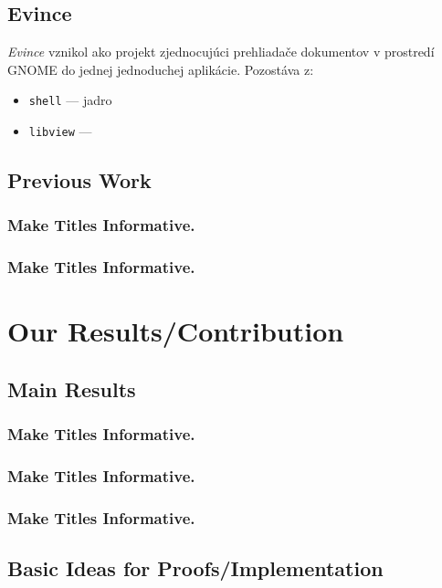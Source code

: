 \documentclass{beamer}
\begin{document}
\subsection{Evince}
\begin{frame}
\emph{Evince} vznikol ako projekt zjednocujúci prehliadače dokumentov v prostredí GNOME do jednej jednoduchej aplikácie. Pozostáva z:
    \begin{itemize}
     \item \texttt{shell} --- jadro
     \item \texttt{libview} --- 
    \end{itemize}
\end{frame}

\subsection{Previous Work}

\begin{frame}
  \frametitle{Make Titles Informative.}
\end{frame}

\begin{frame}
  \frametitle{Make Titles Informative.}
\end{frame}


 
\section{Our Results/Contribution}

\subsection{Main Results}

\begin{frame}
  \frametitle{Make Titles Informative.}
\end{frame}

\begin{frame}
  \frametitle{Make Titles Informative.}
\end{frame}

\begin{frame}
  \frametitle{Make Titles Informative.}
\end{frame}


\subsection{Basic Ideas for Proofs/Implementation}
\end{document}
